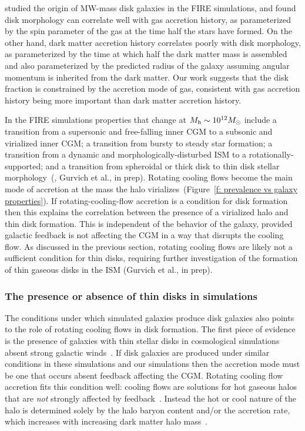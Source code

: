 \documentclass[fleqn,usenatbib]{mnras}
\begin{document}
\citeauthor{Garrison-Kimmel2018} studied the origin of MW-mass disk galaxies in the FIRE simulations, and found disk morphology can correlate well with gas accretion history, as parameterized by the spin parameter of the gas at the time half the stars have formed.
On the other hand, dark matter accretion history correlates poorly with disk morphology, as parameterized by the time at which half the dark matter mass is assembled and also parameterized by the predicted radius of the galaxy assuming angular momentum is inherited from the dark matter.
Our work suggests that the disk fraction is constrained by the accretion mode of gas, consistent with gas accretion history being more important than dark matter accretion history.

In the FIRE simulations properties that change at $M_{\rm h}\sim10^{12} M_\odot$ include a transition from a supersonic and free-falling inner CGM to a subsonic and virialized inner CGM;
a transition from bursty to steady star formation;
a transition from a dynamic and morphologically-disturbed ISM to a rotationally-supported;
and a transition from spheroidal or thick disk to thin disk stellar morphology~(\citealt{El-Badry2018a, Stern2020, Yu2021}, Gurvich et al., in prep).
Rotating cooling flows become the main mode of accretion at the mass the halo virializes~(Figure~\ref{f: prevalence vs galaxy properties}).
If rotating-cooling-flow accretion is a condition for disk formation then this explains the correlation between the presence of a virialized halo and thin disk formation.
This is independent of the behavior of the galaxy, provided galactic feedback is not affecting the CGM in a way that disrupts the cooling flow.
As discussed in the previous section, rotating cooling flows are likely not a sufficient condition for thin disks, requiring further investigation of the formation of thin gaseous disks in the ISM (Gurvich et al., in prep).

\subsubsection{The presence or absence of thin disks in simulations}
\label{s: disk formation -- population}

The conditions under which simulated galaxies produce disk galaxies also points to the role of rotating cooling flows in disk formation.
The first piece of evidence is the presence of galaxies with thin stellar disks in cosmological simulations absent strong galactic winds~\citep{Guedes2011, Bird2013}.
If disk galaxies are produced under similar conditions in these simulations and our simulations then the accretion mode must be one that occurs absent feedback affecting the CGM.
Rotating cooling flow accretion fits this condition well:
cooling flows are solutions for hot gaseous halos that are \textit{not} strongly affected by feedback~\citep{Stern2019}.
Instead the hot or cool nature of the halo is determined solely by the halo baryon content and/or the accretion rate, which increases with increasing dark matter halo mass~\citep{Stern2020a}.
\end{document}
